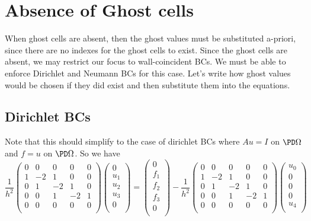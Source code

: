 \documentclass[11pt]{article}
\begin{document}
\section{Absence of Ghost cells}
When ghost cells are absent, then the ghost values must be substituted a-priori, since there are no indexes for the ghost cells to exist. Since the ghost cells are absent, we may restrict our focus to wall-coincident BCs. We must be able to enforce Dirichlet and Neumann BCs for this case. Let's write how ghost values would be chosen if they did exist and then substitute them into the equations.

\subsection{Dirichlet BCs}
Note that this should simplify to the case of dirichlet BCs where $Au=I$ on $\PD \Omega$ and $f = u$ on $\PD \Omega$. So we have
\begin{equation}
\frac{1}{h^2}
 \begin{pmatrix}
  0 &  0 &  0 &  0 &  0 \\
  1 & -2 &  1 &  0 &  0 \\
  0 &  1 & -2 &  1 &  0 \\
  0 &  0 &  1 & -2 &  1 \\
  0 &  0 &  0 &  0 &  0 \\
 \end{pmatrix}
 \begin{pmatrix}
  0 \\  u_1 \\  u_2 \\  u_3 \\  0 \\
 \end{pmatrix}
  =
 \begin{pmatrix}
  0 \\  f_1 \\  f_2 \\  f_3 \\  0 \\
 \end{pmatrix}
   -
\frac{1}{h^2}
 \begin{pmatrix}
  0 &  0 &  0 &  0 &  0 \\
  1 & -2 &  1 &  0 &  0 \\
  0 &  1 & -2 &  1 &  0 \\
  0 &  0 &  1 & -2 &  1 \\
  0 &  0 &  0 &  0 &  0 \\
 \end{pmatrix}
 \begin{pmatrix}
  u_0 \\  0 \\  0 \\  0 \\  u_4 \\
 \end{pmatrix}
\end{equation}
\end{document}
